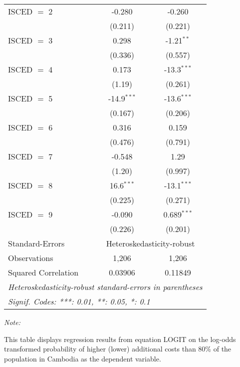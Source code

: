 \begin{table}[htbp!]
\begin{adjustbox}{width = 1\textwidth, max height = 0.95\textheight, center}
\begin{threeparttable}[b]
\begin{tabular}{lcc}
            ISCED $=$ 2          & -0.280         & -0.260\\   
                                 & (0.211)        & (0.221)\\   
            ISCED $=$ 3          & 0.298          & -1.21$^{**}$\\   
                                 & (0.336)        & (0.557)\\   
            ISCED $=$ 4          & 0.173          & -13.3$^{***}$\\   
                                 & (1.19)         & (0.261)\\   
            ISCED $=$ 5          & -14.9$^{***}$  & -13.6$^{***}$\\   
                                 & (0.167)        & (0.206)\\   
            ISCED $=$ 6          & 0.316          & 0.159\\   
                                 & (0.476)        & (0.791)\\   
            ISCED $=$ 7          & -0.548         & 1.29\\   
                                 & (1.20)         & (0.997)\\   
            ISCED $=$ 8          & 16.6$^{***}$   & -13.1$^{***}$\\   
                                 & (0.225)        & (0.271)\\   
            ISCED $=$ 9          & -0.090         & 0.689$^{***}$\\   
                                 & (0.226)        & (0.201)\\   
            \midrule 
            Standard-Errors & \multicolumn{2}{c}{Heteroskedasticity-robust} \\ 
            Observations         & 1,206          & 1,206\\  
            Squared Correlation  & 0.03906        & 0.11849\\  
            \midrule \midrule
            \multicolumn{3}{l}{\emph{Heteroskedasticity-robust standard-errors in parentheses}}\\
            \multicolumn{3}{l}{\emph{Signif. Codes: ***: 0.01, **: 0.05, *: 0.1}}\\
         \end{tabular}
         
         \begin{tablenotes}\item \medskip \textit{Note:}
            \item This table displays regression results from equation LOGIT on the log-odds transformed probability of higher (lower) additional costs than 80\% of the population in Cambodia as the dependent variable. 
         \end{tablenotes}
      \end{threeparttable}
   \end{adjustbox}
\end{table}


